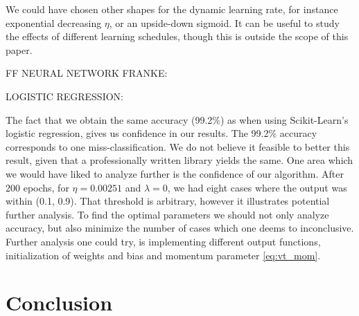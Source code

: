 \documentclass[12pt]{extarticle}
\begin{document}
We could have chosen other shapes for the dynamic learning rate, for instance exponential decreasing $\eta$, or an upside-down sigmoid. It can be useful to study the effects of different learning schedules, though this is outside the scope of this paper.

FF NEURAL NETWORK FRANKE:



LOGISTIC REGRESSION:

The fact that we obtain the same accuracy (99.2\%) as when using Scikit-Learn's logistic regression, gives us confidence in our results. The 99.2\% accuracy corresponds to one miss-classification. We do not believe it feasible to better this result, given that a professionally written library yields the same. One area which we would have liked to analyze further is the confidence of our algorithm. After 200 epochs, for $\eta = 0.00251$ and $\lambda = 0$, we had eight cases where the output was within (0.1, 0.9). That threshold is arbitrary, however it illustrates potential further analysis. To find the optimal parameters we should not only analyze accuracy, but also minimize the number of cases which one deems to inconclusive. Further analysis one could try, is implementing different output functions, initialization of weights and bias and momentum parameter \eqref{eq:vt_mom}.

\section{Conclusion}




\end{document}

